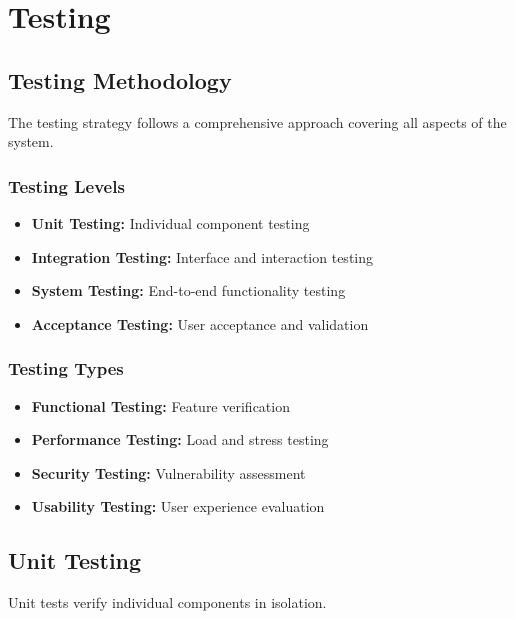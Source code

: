 \documentclass[11pt]{report}
\begin{document}
\chapter{Testing}
\section{Testing Methodology}
The testing strategy follows a comprehensive approach covering all aspects of the system.

\subsection{Testing Levels}
\begin{itemize}
    \item \textbf{Unit Testing:} Individual component testing
    \item \textbf{Integration Testing:} Interface and interaction testing
    \item \textbf{System Testing:} End-to-end functionality testing
    \item \textbf{Acceptance Testing:} User acceptance and validation
\end{itemize}

\subsection{Testing Types}
\begin{itemize}
    \item \textbf{Functional Testing:} Feature verification
    \item \textbf{Performance Testing:} Load and stress testing
    \item \textbf{Security Testing:} Vulnerability assessment
    \item \textbf{Usability Testing:} User experience evaluation
\end{itemize}

\section{Unit Testing}
Unit tests verify individual components in isolation.
\end{document}
